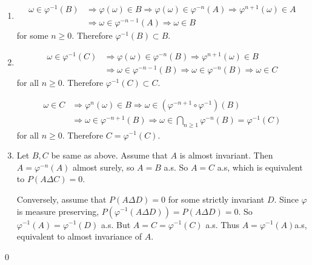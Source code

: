 \begin{problem}[6.1.2] \hfill

	\begin{enumerate}
		\item 
			\[
				\begin{split}
					\omega \in \varphi^{-1}(B)
					&\Rightarrow \varphi(\omega) \in B
					\Rightarrow \varphi(\omega) \in \varphi^{-n}(A)
					\Rightarrow \varphi^{n+1}(\omega) \in A \\
					&\Rightarrow \omega \in \varphi^{-n-1}(A)
					\Rightarrow \omega \in B
				\end{split}
			\]
			for some $n \ge 0$.
			Therefore $\varphi^{-1}(B) \subset B$.

		\item
			\[
\begin{split}
	\omega \in \varphi^{-1}(C) &\Rightarrow \varphi(\omega) \in \varphi^{-n}(B)
	\Rightarrow \varphi^{n+1}(\omega) \in B \\
	&\Rightarrow \omega \in \varphi^{-n-1}(B) \Rightarrow \omega \in \varphi^{-n}(B)
\Rightarrow \omega \in C
\end{split}
	\]
	for all $n \ge 0$.
	Therefore $\varphi^{-1}(C) \subset C$.

	\[
		\begin{split}
			\omega \in C
			&\Rightarrow \varphi^n(\omega) \in B
			\Rightarrow \omega \in (\varphi^{-n+1} \circ \varphi^{-1})(B) \\
			&\Rightarrow \omega \in \varphi^{-n+1}(B)
			\Rightarrow \omega \in \bigcap_{n \ge 1} \varphi^{-n}(B) = \varphi^{-1}(C)
		\end{split}
	\]
	for all $n \ge 0$.
	Therefore $C = \varphi^{-1}(C)$.

\item Let $B, C$ be same as above.
	Assume that $A$ is almost invariant.
	Then $A = \varphi^{-n}(A)$ almost surely, so $A = B$ a.s.
	So $A = C$ a.s, which is equivalent to $P(A \Delta C) = 0$.

	Conversely, assume that $P(A \Delta D) = 0$ for some strictly invariant $D$.
	Since $\varphi$ is measure preserving, $P(\varphi^{-1}(A \Delta D)) = P(A \Delta D) = 0$.
	So $\varphi^{-1}(A) = \varphi^{-1}(D)$ a.s.
	But $A = C = \varphi^{-1}(C)$ a.s.
	Thus $A = \varphi^{-1}(A)$a.s, equivalent to almost invariance of $A$.

	\end{enumerate}

	\qed
\end{problem}

